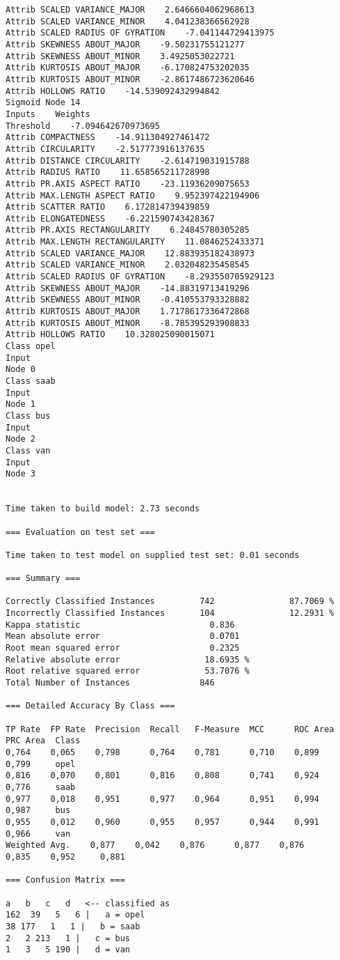 \documentclass[
	article,			%
	11pt,				%
	oneside,			%
	a4paper,			%
	english,			%
	brazil,				%
	sumario=tradicional
	]{abntex2}
\begin{document}
\begin{lstlisting}
Attrib SCALED VARIANCE_MAJOR    2.6466604062968613
Attrib SCALED VARIANCE_MINOR    4.041238366562928
Attrib SCALED RADIUS OF GYRATION    -7.041144729413975
Attrib SKEWNESS ABOUT_MAJOR    -9.50231755121277
Attrib SKEWNESS ABOUT_MINOR    3.4925053022721
Attrib KURTOSIS ABOUT_MAJOR    -6.170824753202035
Attrib KURTOSIS ABOUT_MINOR    -2.8617486723620646
Attrib HOLLOWS RATIO    -14.539092432994842
Sigmoid Node 14
Inputs    Weights
Threshold    -7.094642670973695
Attrib COMPACTNESS    -14.911304927461472
Attrib CIRCULARITY    -2.517773916137635
Attrib DISTANCE CIRCULARITY    -2.614719031915788
Attrib RADIUS RATIO    11.658565211728998
Attrib PR.AXIS ASPECT RATIO    -23.11936209075653
Attrib MAX.LENGTH ASPECT RATIO    9.952397422194906
Attrib SCATTER RATIO    6.172814739439859
Attrib ELONGATEDNESS    -6.221590743428367
Attrib PR.AXIS RECTANGULARITY    6.24845780305285
Attrib MAX.LENGTH RECTANGULARITY    11.0846252433371
Attrib SCALED VARIANCE_MAJOR    12.883935182438973
Attrib SCALED VARIANCE_MINOR    2.032048235458545
Attrib SCALED RADIUS OF GYRATION    -8.293550705929123
Attrib SKEWNESS ABOUT_MAJOR    -14.88319713419296
Attrib SKEWNESS ABOUT_MINOR    -0.410553793328882
Attrib KURTOSIS ABOUT_MAJOR    1.7178617336472868
Attrib KURTOSIS ABOUT_MINOR    -8.785395293908833
Attrib HOLLOWS RATIO    10.328025090015071
Class opel
Input
Node 0
Class saab
Input
Node 1
Class bus
Input
Node 2
Class van
Input
Node 3


Time taken to build model: 2.73 seconds

=== Evaluation on test set ===

Time taken to test model on supplied test set: 0.01 seconds

=== Summary ===

Correctly Classified Instances         742               87.7069 %
Incorrectly Classified Instances       104               12.2931 %
Kappa statistic                          0.836 
Mean absolute error                      0.0701
Root mean squared error                  0.2325
Relative absolute error                 18.6935 %
Root relative squared error             53.7076 %
Total Number of Instances              846     

=== Detailed Accuracy By Class ===

TP Rate  FP Rate  Precision  Recall   F-Measure  MCC      ROC Area  PRC Area  Class
0,764    0,065    0,798      0,764    0,781      0,710    0,899     0,799     opel
0,816    0,070    0,801      0,816    0,808      0,741    0,924     0,776     saab
0,977    0,018    0,951      0,977    0,964      0,951    0,994     0,987     bus
0,955    0,012    0,960      0,955    0,957      0,944    0,991     0,966     van
Weighted Avg.    0,877    0,042    0,876      0,877    0,876      0,835    0,952     0,881     

=== Confusion Matrix ===

a   b   c   d   <-- classified as
162  39   5   6 |   a = opel
38 177   1   1 |   b = saab
2   2 213   1 |   c = bus
1   3   5 190 |   d = van

\end{lstlisting}
\end{document}

